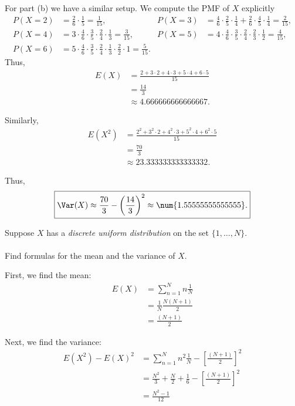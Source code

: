 \begin{solution}
  For part (b) we have a similar setup. We compute the PMF of \(X\)
  explicitly
  \begin{align*}
    P(X=2)&=\frac{2}{6}\cdot\frac{1}{5}=\frac{1}{15},
    &P(X=3)&=\frac{4}{6}\cdot\frac{2}{5}\cdot\frac{1}{4}+\frac{2}{6}\cdot\frac{4}{5}\cdot\frac{1}{4}
           =\frac{2}{15},\\
    P(X=4)&=3\cdot\frac{4}{6}\cdot\frac{3}{5}\cdot\frac{2}{4}\cdot\frac{1}{3}
          =\frac{3}{15},
    &P(X=5)&=4\cdot\frac{4}{6}\cdot\frac{3}{5}\cdot\frac{2}{4}
           \cdot\frac{2}{3}\cdot\frac{1}{2}
           =\frac{4}{15},\\
    P(X=6)&=5\cdot\frac{4}{6}\cdot\frac{3}{5}\cdot
          \frac{2}{4}\cdot\frac{1}{3}\cdot\frac{2}{2}\cdot 1
          =\frac{5}{15}.
  \end{align*}
  Thus,
  \[
    \boxed{
      \begin{aligned}
        E(X)
        &=\frac{2+3\cdot 2+4\cdot 3+5\cdot 4+6\cdot 5}{15}\\
        &=\frac{14}{3}\\
        &\approx\num{4.666666666666667}.
      \end{aligned}
    }
  \]

  Similarly,
  \begin{align*}
    E(X^2)
    &=\frac{2^2+3^2\cdot 2+4^2\cdot 3+5^2\cdot 4+6^2\cdot 5}{15}\\
    &=\frac{70}{3}\\
    &\approx\num{23.333333333333332}.
  \end{align*}

  Thus,
  \[
    \boxed{\Var(X)\approx
      \frac{70}{3}-\left(\frac{14}{3}\right)^2\approx\num{1.55555555555555}.}
  \]
\end{solution}
\newpage

\begin{problem}[Handout 7, \# 10]
  Suppose \(X\) has a \emph{discrete uniform distribution} on the set
  \(\{1,\dotsc,N\}\).
  \\\\
  Find formulas for the mean and the variance of \(X\).
\end{problem}
\begin{solution}

  First, we find the mean:
  \begin{align*}
    E(X) &= \sum_{n=1}^N n \frac{1}{N}\\
         &= \frac{1}{N} \frac{N(N+1)}{2}\\
         &=\frac{(N+1)}{2}
  \end{align*}

  Next, we find the variance:
\begin{align*}
  E(X^2) - E(X)^2
  &= \sum_{n=1}^N n^2 \frac{1}{N} - \left[\frac{(N+1)}{2}\right]^2\\
  &=\frac{N^2}{3}+\frac{N}{2}+\frac{1}{6}-\left[\frac{(N+1)}{2}\right]^2\\
  &=\frac{N^2-1}{12}
\end{align*}
\end{solution}
\newpage

